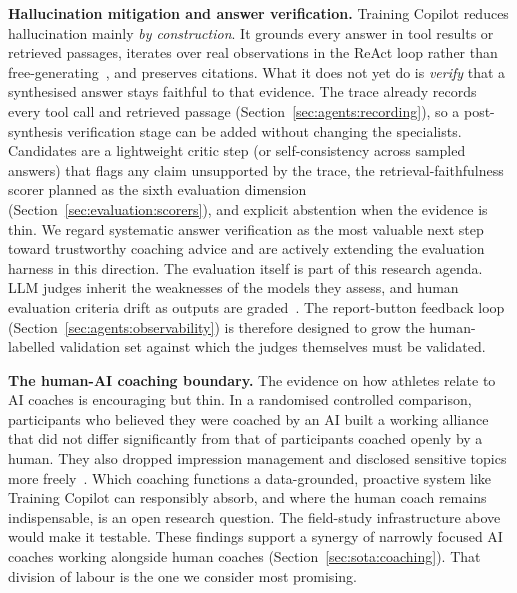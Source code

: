 \textbf{Hallucination mitigation and answer verification.} Training Copilot reduces hallucination mainly \textit{by construction}. It grounds every answer in tool results or retrieved passages, iterates over real observations in the ReAct loop rather than free-generating~\citep{yao_react_2023}, and preserves citations. What it does not yet do is \textit{verify} that a synthesised answer stays faithful to that evidence. The trace already records every tool call and retrieved passage (Section~\ref{sec:agents:recording}), so a post-synthesis verification stage can be added without changing the specialists. Candidates are a lightweight critic step (or self-consistency across sampled answers) that flags any claim unsupported by the trace, the retrieval-faithfulness scorer planned as the sixth evaluation dimension (Section~\ref{sec:evaluation:scorers}), and explicit abstention when the evidence is thin. We regard systematic answer verification as the most valuable next step toward trustworthy coaching advice and are actively extending the evaluation harness in this direction. The evaluation itself is part of this research agenda. LLM judges inherit the weaknesses of the models they assess, and human evaluation criteria drift as outputs are graded~\citep{shankar_validates_2024}. The report-button feedback loop (Section~\ref{sec:agents:observability}) is therefore designed to grow the human-labelled validation set against which the judges themselves must be validated.

\textbf{The human-AI coaching boundary.} The evidence on how athletes relate to AI coaches is encouraging but thin. In a randomised controlled comparison, participants who believed they were coached by an AI built a working alliance that did not differ significantly from that of participants coached openly by a human. They also dropped impression management and disclosed sensitive topics more freely~\citep{barger_artificial_2025}. Which coaching functions a data-grounded, proactive system like Training Copilot can responsibly absorb, and where the human coach remains indispensable, is an open research question. The field-study infrastructure above would make it testable. These findings support a synergy of narrowly focused AI coaches working alongside human coaches (Section~\ref{sec:sota:coaching}). That division of labour is the one we consider most promising.

